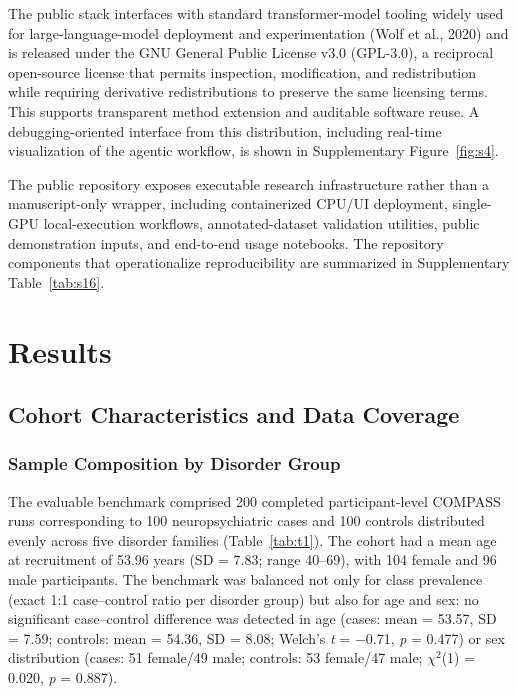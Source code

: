 \documentclass[11pt,a4paper,twoside]{article}
\newcommand{\FloatBarrier}{\par}
\begin{document}
The public stack interfaces with standard transformer-model tooling widely used for large-language-model deployment and experimentation (Wolf et al., 2020) and is released under the GNU General Public License v3.0 (GPL-3.0), a reciprocal open-source license that permits inspection, modification, and redistribution while requiring derivative redistributions to preserve the same licensing terms. This supports transparent method extension and auditable software reuse. A debugging-oriented interface from this distribution, including real-time visualization of the agentic workflow, is shown in Supplementary Figure~\ref{fig:s4}.

The public repository exposes executable research infrastructure rather than a manuscript-only wrapper, including containerized CPU/UI deployment, single-GPU local-execution workflows, annotated-dataset validation utilities, public demonstration inputs, and end-to-end usage notebooks. The repository components that operationalize reproducibility are summarized in Supplementary Table~\ref{tab:s16}.

\FloatBarrier
\section{Results}

\subsection{Cohort Characteristics and Data Coverage}

\subsubsection{Sample Composition by Disorder Group}

The evaluable benchmark comprised 200 completed participant-level COMPASS runs corresponding to 100 neuropsychiatric cases and 100 controls distributed evenly across five disorder families (Table~\ref{tab:t1}). The cohort had a mean age at recruitment of 53.96 years (SD = 7.83; range 40--69), with 104 female and 96 male participants. The benchmark was balanced not only for class prevalence (exact 1:1 case--control ratio per disorder group) but also for age and sex: no significant case--control difference was detected in age (cases: mean = 53.57, SD = 7.59; controls: mean = 54.36, SD = 8.08; Welch's \textit{t} = $-$0.71, \textit{p} = 0.477) or sex distribution (cases: 51 female/49 male; controls: 53 female/47 male; $\chi^2$(1) = 0.020, \textit{p} = 0.887).
\end{document}
